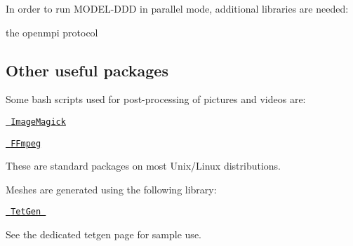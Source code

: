 In order to run M\+O\+D\+E\+L-\/\+D\+DD in parallel mode, additional libraries are needed\+:
\begin{DoxyItemize}
\item the openmpi protocol
\end{DoxyItemize}\hypertarget{index_packages}{}\subsection{Other useful packages}\label{index_packages}
Some bash scripts used for post-\/processing of pictures and videos are\+:
\begin{DoxyItemize}
\item \href{http://www.imagemagick.org}{\texttt{ Image\+Magick}}
\item \href{http://www.ffmpeg.org}{\texttt{ F\+Fmpeg}}
\end{DoxyItemize}

These are standard packages on most Unix/\+Linux distributions.

Meshes are generated using the following library\+:
\begin{DoxyItemize}
\item \href{http://tetgen.berlios.de}{\texttt{ Tet\+Gen }}
\end{DoxyItemize}

See the dedicated tetgen page for sample use. 